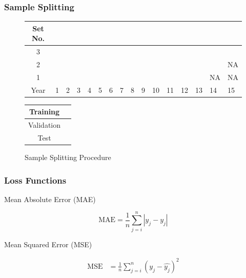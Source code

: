 \documentclass[aspectratio=169]{beamer}
\begin{document}
\begin{frame}
\frametitle{Sample Splitting}
\begin{figure}
	\begin{center}
		\begin{tabular}{|c|p{0.40cm}p{0.40cm}p{0.40cm}p{0.40cm}p{0.40cm}p{0.40cm}p{0.40cm}p{0.40cm}p{0.40cm}p{0.40cm}p{0.40cm}p{0.40cm}p{0.40cm}p{0.40cm}p{0.40cm}|}
			\hline
			Set No. &&&&&&&&&&&&&&& \\
			\hline
			3 & \cellcolor{cyan} & \cellcolor{cyan} & \cellcolor{cyan} & \cellcolor{cyan} & \cellcolor{cyan} & \cellcolor{cyan} & \cellcolor{cyan} & \cellcolor{cyan} & \cellcolor{cyan} &
			\cellcolor{pink} & \cellcolor{pink} & \cellcolor{pink} & \cellcolor{pink} & \cellcolor{pink} & 	
			\cellcolor{olive} \\
			2 & \cellcolor{cyan} & \cellcolor{cyan} & \cellcolor{cyan} & \cellcolor{cyan} & \cellcolor{cyan} & \cellcolor{cyan} & \cellcolor{cyan} & \cellcolor{cyan} &
			\cellcolor{pink} & \cellcolor{pink} & \cellcolor{pink} & \cellcolor{pink} & \cellcolor{pink} & 	
			\cellcolor{olive} & NA  \\
			1 & \cellcolor{cyan} & \cellcolor{cyan} & \cellcolor{cyan} & \cellcolor{cyan} & \cellcolor{cyan} & \cellcolor{cyan} & \cellcolor{cyan} &
			\cellcolor{pink} & \cellcolor{pink} & \cellcolor{pink} & \cellcolor{pink} & \cellcolor{pink} & 	
			\cellcolor{olive} & NA & NA \\
			\hline
			Year & 1 & 2 & 3 & 4 & 5 & 6 & 7 & 8 & 9 & 10 & 11 & 12 & 13 & 14 & 15\\
			\hline
		\end{tabular}
		\medskip
		\begin{tabular}{|c|p{0.40cm}|}
			\hline
			Training & \cellcolor{cyan} \\
			\hline
			Validation & \cellcolor{pink} \\
			\hline
			Test & \cellcolor{olive} \\
			\hline
		\end{tabular}
	\end{center}
	\caption{Sample Splitting Procedure}
	\label{sample_split_diag}
\end{figure}
\end{frame}


\begin{frame}
\frametitle{Loss Functions}
Mean Absolute Error (MAE)

	\begin{equation}
	\text{MAE} = \frac{1}{n} \sum_{j = i}^{n} |y_j - \hat{y_j}|
	\end{equation}
	
Mean Squared Error (MSE)

	\begin{align}
	\text{MSE} &= \frac{1}{n} \sum_{j = i}^{n} \left( y_j - \hat{y_j}\right) ^2
	\end{align}

\end{frame}
\end{document}
